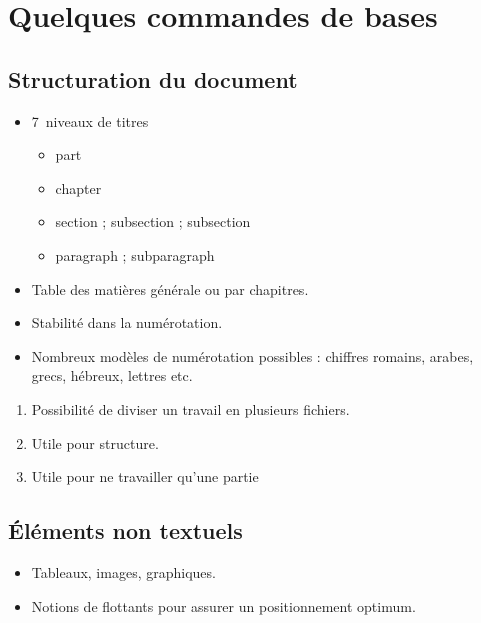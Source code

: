 \section{Quelques commandes de bases}

\subsection{Structuration du document}

\begin{slide}
  \begin{itemize}
    \item 7~niveaux de titres
      \begin{itemize}
	\item part
	\item chapter
	\item section ; subsection ; subsection
	\item paragraph ; subparagraph
      \end{itemize}
    \item Table des matières générale ou par chapitres.
    \item Stabilité dans la numérotation.
    \item Nombreux modèles de numérotation possibles : chiffres romains, arabes, grecs, hébreux, lettres etc.
  \end{itemize}
\end{slide}
\begin{slide}
\begin{enumerate}
  \item Possibilité de diviser un travail en plusieurs fichiers.
  \item Utile pour structure.
  \item Utile pour ne travailler qu'une partie
\end{enumerate}
\end{slide}
\subsection{Éléments non textuels}

\begin{slide}
  \begin{itemize}
    \item Tableaux, images, graphiques.
    \item Notions de flottants pour assurer un positionnement optimum.
  \end{itemize}
\end{slide}

